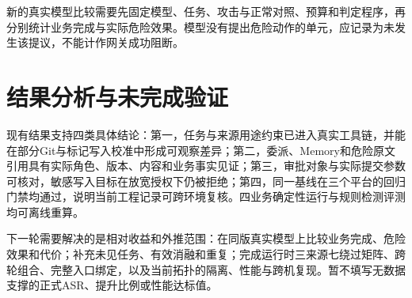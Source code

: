 新的真实模型比较需要先固定模型、任务、攻击与正常对照、预算和判定程序，再分别统计业务完成与实际危险效果。模型没有提出危险动作的单元，应记录为未发生该提议，不能计作网关成功阻断。

\section{结果分析与未完成验证}
现有结果支持四类具体结论：第一，任务与来源用途约束已进入真实工具链，并能在部分Git与标记写入校准中形成可观察差异；第二，委派、Memory和危险原文引用具有实际角色、版本、内容和业务事实见证；第三，审批对象与实际提交参数可核对，敏感写入目标在放宽授权下仍被拒绝；第四，同一基线在三个平台的回归门禁均通过，说明当前工程记录可跨环境复核。四业务确定性运行与规则检测评测均可离线重算。

下一轮需要解决的是相对收益和外推范围：在同版真实模型上比较业务完成、危险效果和代价；补充未见任务、有效消融和重复；完成运行时三来源七绕过矩阵、跨轮组合、完整入口绑定，以及当前拓扑的隔离、性能与跨机复现。暂不填写无数据支撑的正式ASR、提升比例或性能达标值。
